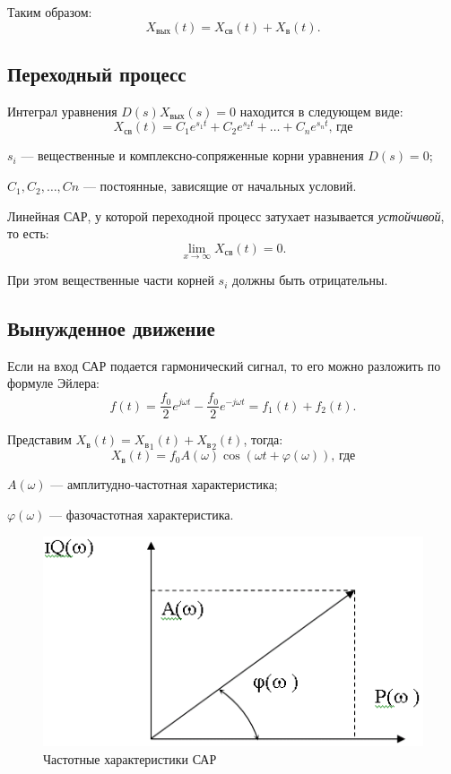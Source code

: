 \documentclass[unicode, 12pt, a4paper, oneside]{article}
\begin{document}
Таким образом:
\begin{equation}
X_\text{вых}(t) = X_\text{св}(t) + X_\text{в}(t).
\end{equation}

\subsection*{Переходный процесс}

Интеграл уравнения $ D(s) X_\text{вых}(s) = 0 $ находится в следующем виде:
\begin{equation}
X_\text{св}(t) = C_1 e^{s_1 t} + C_2 e^{s_2 t} + \ldots + C_n e^{s_n t} \text{, где}
\end{equation}
\par $ s_i $ --- вещественные и комплексно-сопряженные корни уравнения $ D(s) = 0 $;\nopagebreak
\par $ C_1 , C_2 , \ldots, Cn $  ---  постоянные, зависящие от начальных условий.

Линейная САР, у которой переходной процесс затухает называется \textit{устойчивой}, то есть:
\begin{equation}
\lim\limits_{x \rightarrow \infty} X_\text{св}(t) = 0.
\end{equation}

При этом вещественные части корней $ s_i $ должны быть отрицательны.

\subsection*{Вынужденное движение}

Если на вход САР подается гармонический сигнал, то его можно разложить по формуле Эйлера:
\begin{equation}
f(t) = \dfrac{f_0}{2} e^{j\omega t} - \dfrac{f_0}{2} e^{-j\omega t} = f_1(t) + f_2(t).
\end{equation}

Представим $ X_\text{в}(t) = {X_\text{в}}_1(t) + {X_\text{в}}_2(t) $, тогда:
\begin{equation}
X_\text{в}(t) = f_0 A(\omega) \cos(\omega t + \varphi(\omega))\text{, где}
\end{equation}
\par $ A(\omega) $ --- амплитудно-частотная характеристика;\nopagebreak
\par $ \varphi(\omega) $  ---  фазочастотная характеристика.

\begin{figure}[H]
\centering
\includegraphics[width=0.5\linewidth]{23_chars.png}
\caption{Частотные характеристики САР}
\end{figure}
\end{document}

